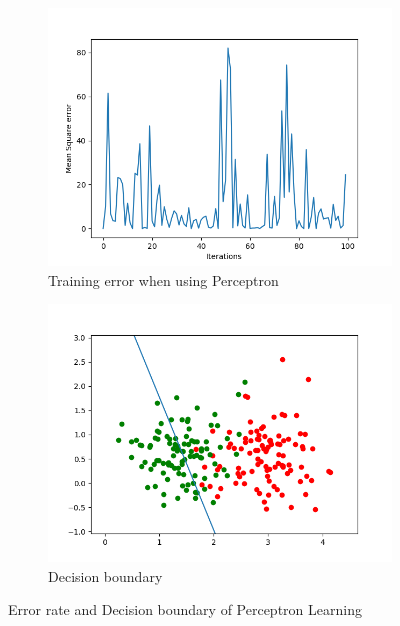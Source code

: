 \documentclass[a4paper]{article}
\begin{document}
\begin{figure}[htb]
    \centering
    \begin{subfigure}{0.4\textwidth}
         \includegraphics[width=\textwidth]{Labs/Lab 1/Lab 1a/Results/perceptron-NON_SEPERABLE_training_errorRate(rakin-modifed).png}
        \caption{Training error when using Perceptron}
        \label{fig:Perceptron-training-error}
    \end{subfigure}
    \hfill
    \begin{subfigure}{0.4\textwidth}
        \includegraphics[width=\textwidth]{Labs/Lab 1/Lab 1a/Results/perceptron-decision-boundary-not-separable.png}
        \caption{Decision boundary}
        \label{fig:decision-boundary}
    \end{subfigure}
    \caption{Error rate and Decision boundary of Perceptron Learning}
\end{figure}
\end{document}
